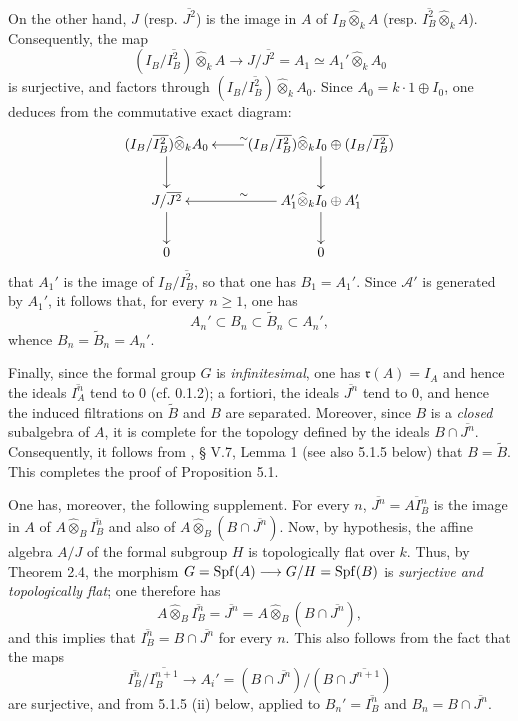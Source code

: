 On the other hand, $J$ (resp. $\overline{J^2}$) is the image in $A$ of $I_B\widehat\otimes_k A$ (resp. $\overline{I_B^2}\widehat\otimes_k A$). Consequently, the map
\[
(I_B/\overline{I_B^2})\widehat\otimes_k A\longrightarrow J/\overline{J^2}=A_1\simeq A_1'\widehat\otimes_k A_0
\]
is surjective, and factors through $(I_B/\overline{I_B^2})\widehat\otimes_k A_0$. Since $A_0=k\cdot1\oplus I_0$, one deduces from the commutative exact diagram:
\[
\xymatrix@C=22pt@R=22pt{
(I_B/\overline{I_B^2})\widehat\otimes_k A_0\ar[d]&(I_B/\overline{I_B^2})\widehat\otimes_k I_0\oplus(I_B/\overline{I_B^2})\ar[l]_\sim\ar[d]\\
J/\overline{J^2}\ar[d]&A_1'\widehat\otimes_k I_0\oplus A_1'\ar[l]_\sim\ar[d]\\
0&0}
\]
that $A_1'$ is the image of $I_B/\overline{I_B^2}$, so that one has $B_1=A_1'$. Since $\mathscr A'$ is generated by $A_1'$, it follows that, for every $n\ge1$, one has
\[
A_n'\subset B_n\subset\widetilde B_n\subset A_n',
\]
whence $B_n=\widetilde B_n=A_n'$.

Finally, since the formal group $G$ is \emph{infinitesimal}, one has $\mathfrak r(A)=I_A$ and hence the ideals $\overline{I_A^n}$ tend to $0$ (cf. 0.1.2); a fortiori, the ideals $\overline{J^n}$ tend to $0$, and hence the induced filtrations on $\widetilde B$ and $B$ are separated. Moreover, since $B$ is a \emph{closed} subalgebra of $A$, it is complete for the topology defined by the ideals $B\cap\overline{J^n}$. Consequently, it follows from \cite{CA}, § V.7, Lemma 1 (see also 5.1.5 below) that $B=\widetilde B$. This completes the proof of Proposition 5.1.

One has, moreover, the following supplement. For every $n$, $\overline{J^n}=\overline{AI_B^n}$ is the image in $A$ of $A\widehat\otimes_B\overline{I_B^n}$ and also of $A\widehat\otimes_B(B\cap\overline{J^n})$. Now, by hypothesis, the affine algebra $A/J$ of the formal subgroup $H$ is topologically flat over $k$. Thus, by Theorem 2.4, the morphism $G=\operatorname{Spf}(A)\longrightarrow G/H=\operatorname{Spf}(B)$ is \emph{surjective and topologically flat}; one therefore has
\[
A\widehat\otimes_B\overline{I_B^n}=\overline{J^n}=A\widehat\otimes_B(B\cap\overline{J^n}),
\]
and this implies that $\overline{I_B^n}=B\cap\overline{J^n}$ for every $n$. This also follows from the fact that the maps
\[
\overline{I_B^n}/\overline{I_B^{n+1}}\longrightarrow A_i'=(B\cap\overline{J^n})/(B\cap\overline{J^{n+1}})
\]
are surjective, and from 5.1.5 (ii) below, applied to $B_n'=\overline{I_B^n}$ and $B_n=B\cap\overline{J^n}$.

